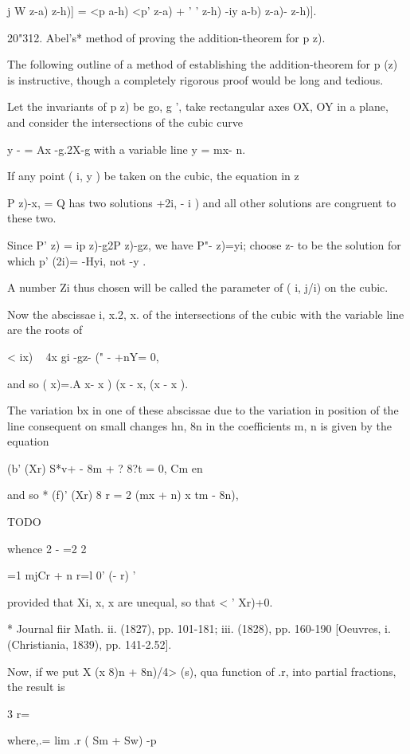 {j W z-a) z-h)] = <p a-h) <p' z-a) + ' ' z-h) -iy a-b) z-a)- z-h)].

 20"312. Abel's* method of proving the
addition-theorem for p z).

The following outline of a method of establishing the addition-theorem
for p (z) is instructive, though a completely rigorous proof would be
long and tedious.

Let the invariants of p z) be go, g ', take rectangular axes OX, OY in
a plane, and consider the intersections of the cubic curve

y - = Ax -g.2X-g with a variable line y = mx- n.

If any point ( i, y ) be taken on the cubic, the equation in z

P z)-x, = Q has two solutions +2i, - i ) and all other
solutions are congruent to these two.

Since P' z) = ip z)-g2P z)-gz, we have P"- z)=yi; choose z- to be the
solution for which p' (2i)= -Hyi, not -y .

A number Zi thus chosen will be called the parameter of ( i, j/i) on
the cubic.

Now the abscissae i, x.2, x. of the intersections of the cubic with
the variable line are the roots of

< ix) ~ 4x gi -gz- (" - +nY= 0,

and so ( x)=.A x- x ) (x - x, (x - x ).

The variation bx in one of these abscissae due to the variation in
position of the line consequent on small changes hn, 8n in the
coefficients m, n is given by the equation

(b' (Xr) S*v+ - 8m + ? 8?t = 0, Cm en

and so * (f)' (Xr) 8 r = 2 (mx + n) x tm - 8n),

TODO

whence 2 - =2 2

=1 mjCr + n r=l 0' (- r) '

provided that Xi, x, x are unequal, so that < ' Xr)+0.

* Journal fiir Math. ii. (1827), pp. 101-181; iii. (1828), pp. 160-190
[Oeuvres, i. (Christiania, 1839), pp. 141-2.52].

%
%

Now, if we put X (x 8)n + 8n)/4> (s), qua function of .r, into partial
fractions, the result is

3 r=\

where,.= lim .r ( Sm + Sw) -p

}
